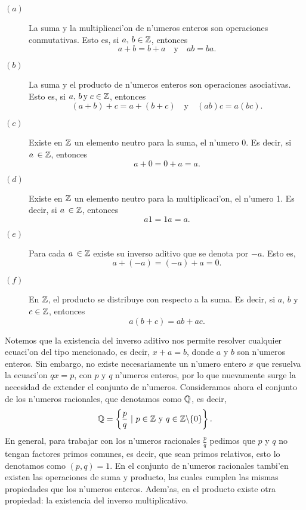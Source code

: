 \begin{propiedades}
\begin{description}
\item[$(a)$] La suma y la multiplicaci'on de n'umeros enteros son operaciones 
conmutativas. 
Esto es, si $a,\,b\in \mathbb{Z}$, entonces
$$
       a+b= b+a\quad \text{y}\quad ab = b a.
$$
\item[$(b)$] La suma y el producto de n'umeros enteros son operaciones 
asociativas. Esto es, 
si $a,\,b\,
\text{y}\; c\in \mathbb{Z}$, entonces
$$
       (a+b)+c= a+(b+c) \quad \text{y}\quad (ab)c= a(bc).
$$
\item[$(c)$] Existe en $\mathbb{Z}$ un elemento neutro para la suma, el n'umero 0. 
Es decir,
si $a\,\in \mathbb{Z}$, entonces
$$
       a+0= 0+a=a.
$$
\item[$(d)$] Existe en $\mathbb{Z}$  un elemento neutro para la multiplicaci'on, el 
n'umero 1.
Es decir,
si $a\,\in \mathbb{Z}$, entonces
$$
       a1= 1a=a.
$$
\item[$(e)$] Para cada $a\,\in\mathbb{Z}$ existe  su inverso aditivo que se
denota por $-a$. Esto es,
$$
       a+(-a)= (-a)+a=0.
$$
\item[$(f)$] En $\mathbb{Z}$, el producto se  distribuye con respecto a la suma.  
Es decir, si
$a$, $b$ y $c \in \mathbb{Z}$, entonces
\begin{equation*}
       a(b+c) =   ab+ac.
\end{equation*}
\end{description}
\end{propiedades}


\vei

Notemos que la existencia del inverso aditivo nos permite resolver cualquier 
ecuaci'on del tipo mencionado, es decir, $x+a= b$, donde $a$ y $b$ son 
n'umeros enteros. Sin embargo,
no existe necesariamente un n'umero entero $x$ que resuelva la ecuaci'on 
$qx=p$, con
$p$ y $q$ n'umeros enteros, por lo que nuevamente surge la necesidad de 
extender el  conjunto de n'umeros.  Consideramos ahora el  conjunto de los 
n'umeros 
racionales, que denotamos  como $\mathbb{Q}$, es decir,  
$$
     \qq = \left \{\frac{p}{q} \ | \ p\in \zz \ \text{y} \ q\in 
\zz\backslash \{0\}  \right \}.
$$
En general, para trabajar con los n'umeros racionales $\frac{p}{q}$ pedimos 
que $p$ y $q$ no tengan factores primos comunes, es decir, que sean primos 
relativos, esto lo denotamos como $(p,q)=1$.
En el conjunto de n'umeros racionales  tambi'en existen las operaciones de 
suma y  producto, las cuales cumplen las mismas propie\-dades que los n'umeros 
enteros.  Adem'as, en el producto existe otra  propiedad: la existencia del inverso multiplicativo.

